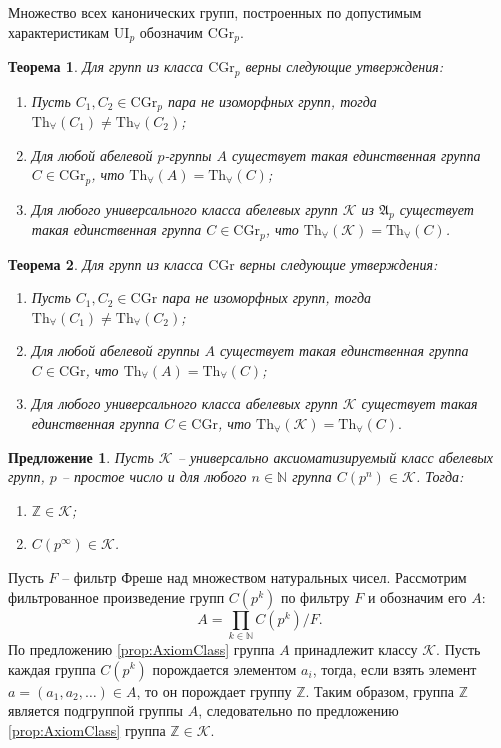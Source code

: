 \documentclass[a4paper,11pt,twoside]{article}
\newtheorem{theorem}{Теорема}[section]
\newtheorem{proposition}{Предложение}[section]
\def\note#1{\marginpar{\textcolor{red}{#1}}}
\def\proof{{\noindent{\bf Доказательство.}} }
\def\A{{\mathfrak{A}}}
\def\K{{\mathcal{K}}}
\def\Z{{\mathbb{Z}}}
\def\N{{\mathbb{N}}}
\def\Tha{{\mathrm{Th}_\forall}}
\def\CG{{\mathrm{CGr}}}
\def\ui{{\mathrm{UI}}}
\begin{document}
Множество всех канонических групп, построенных по допустимым характеристикам $\ui_p$ обозначим $\CG_p$.

\begin{theorem}
Для групп из класса $\CG_p$ верны следующие утверждения:
\begin{enumerate}
\item Пусть $C_1, C_2 \in \CG_p$ пара не изоморфных групп, тогда $\Tha(C_1) \neq \Tha(C_2)$;
\item Для любой абелевой $p$-группы $A$ существует такая единственная группа $C \in \CG_p$, что $\Tha(A) = \Tha(C)$;
\item Для любого универсального класса абелевых групп $\K$ из $\A_p$ существует такая единственная группа $C \in \CG_p$, что $\Tha(\K) = \Tha(C)$.
\end{enumerate}
\end{theorem}
\note{Вставить доказательство}



\begin{theorem}\label{th:CannonicalGroups}
Для групп из класса $\CG$ верны следующие утверждения:
\begin{enumerate}
\item Пусть $C_1, C_2 \in \CG$ пара не изоморфных групп, тогда $\Tha(C_1) \neq \Tha(C_2)$;
\item Для любой абелевой группы $A$ существует такая единственная группа $C \in \CG$, что $\Tha(A) = \Tha(C)$;
\item Для любого универсального класса абелевых групп $\K$ существует такая единственная группа $C \in \CG$, что $\Tha(\K) = \Tha(C).$
\end{enumerate}
\end{theorem}
\note{Вставить доказательство}


\begin{proposition}
Пусть $\K$ -- универсально аксиоматизируемый класс абелевых групп, $p$ -- простое число и для любого $n \in \N$ группа $C(p^n) \in \K$. Тогда:
\begin{enumerate}
\item $\Z \in \K$;
\item $C(p^\infty) \in \K$.  
\end{enumerate}
\end{proposition}

\proof Пусть $F$ -- фильтр Фреше над множеством натуральных чисел. Рассмотрим фильтрованное произведение групп $C(p^k)$ по фильтру $F$ и обозначим его $A$:
$$A = \prod_{k \in \N} C(p^k) \Big/ F.$$ 
По предложению \ref{prop:AxiomClass} группа $A$ принадлежит классу $\K$. 
Пусть каждая группа $C(p^k)$ порождается элементом $a_i$, тогда, если взять элемент $a = (a_1, a_2, \ldots) \in A$, то он порождает группу $\Z$. Таким образом, группа $\Z$ является подгруппой группы $A$, следовательно по предложению \ref{prop:AxiomClass} группа $\Z \in \K$.
\end{document}
